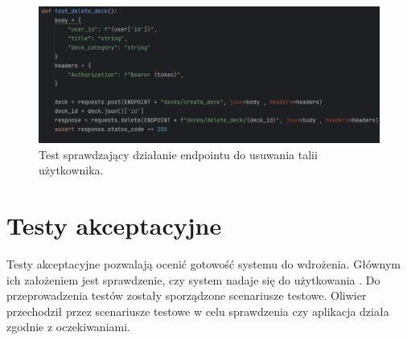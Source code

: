 \begin{figure}[H]
    \centering
    \includegraphics[width=1\textwidth]{chapters/chapter_9/testy1}
    \caption{Test sprawdzający działanie endpointu do usuwania talii użytkownika.}
    \label{img:testy}
\end{figure}

\section{Testy akceptacyjne}

Testy akceptacyjne pozwalają ocenić gotowość systemu do wdrożenia. Głównym ich założeniem jest sprawdzenie, czy system nadaje się do użytkowania \cite{acceptanceTesting}. Do przeprowadzenia testów zostały sporządzone scenariusze testowe. Oliwier przechodził przez scenariusze testowe w celu sprawdzenia czy aplikacja działa zgodnie z oczekiwaniami.


